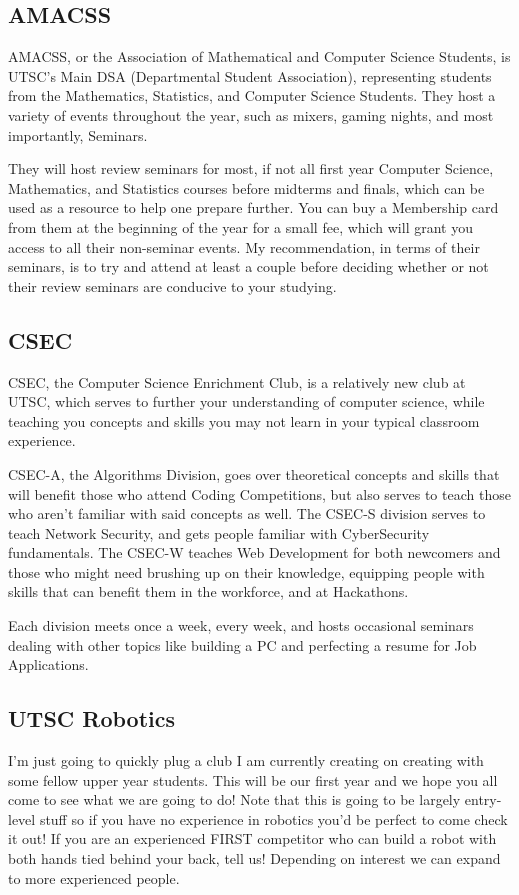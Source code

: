 \documentclass[11pt]{article}
\begin{document}
\subsection{AMACSS}
AMACSS, or the Association of Mathematical and Computer Science Students, is UTSC's Main DSA (Departmental Student Association), representing students from the Mathematics, Statistics, and Computer Science Students.  They host a variety of events throughout the year, such as mixers, gaming nights, and most importantly, Seminars.\par
They will host review seminars for most, if not all first year Computer Science, Mathematics, and Statistics courses before midterms and finals, which can be used as a resource to help one prepare further.  You can buy a Membership card from them at the beginning of the year for a small fee, which will grant you access to all their non-seminar events.  My recommendation, in terms of their seminars, is to try and attend at least a couple before deciding whether or not their review seminars are conducive to your studying.

\subsection{CSEC}
CSEC, the Computer Science Enrichment Club, is a relatively new club at UTSC, which serves to further your understanding of computer science, while teaching you concepts and skills you may not learn in your typical classroom experience.\par
CSEC-A, the Algorithms Division, goes over theoretical concepts and skills that will benefit those who attend Coding Competitions, but also serves to teach those who aren't familiar with said concepts as well.  The CSEC-S division serves to teach Network Security, and gets people familiar with CyberSecurity fundamentals.  The CSEC-W teaches Web Development for both newcomers and those who might need brushing up on their knowledge, equipping people with skills that can benefit them in the workforce, and at Hackathons.\par
Each division meets once a week, every week, and hosts occasional seminars dealing with other topics like building a PC and perfecting a resume for Job Applications.

\subsection{UTSC Robotics}
I'm just going to quickly plug a club I am currently creating on creating with some fellow upper year students. This will be our first year and we hope you all come to see what we are going to do! Note that this is going to be largely entry-level stuff so if you have no experience in robotics you'd be perfect to come check it out! If you are an experienced FIRST competitor who can build a robot with both hands tied behind your back, tell us! Depending on interest we can expand to more experienced people.
\end{document}
